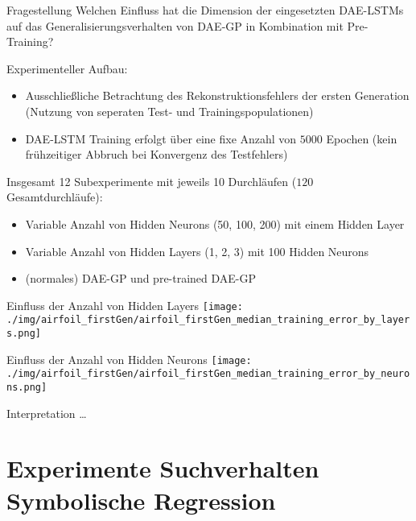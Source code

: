 \documentclass[
  ignorenonframetext,
]{beamer}
\providecommand{\tightlist}{%
  \setlength{\itemsep}{0pt}\setlength{\parskip}{0pt}}
\begin{document}
\begin{frame}{Fragestellung}
\protect\hypertarget{fragestellung}{}
Welchen Einfluss hat die Dimension der eingesetzten DAE-LSTMs auf das
Generalisierungsverhalten von DAE-GP in Kombination mit Pre-Training?

Experimenteller Aufbau:

\begin{itemize}
\tightlist
\item
  Ausschließliche Betrachtung des Rekonstruktionsfehlers der ersten
  Generation (Nutzung von seperaten Test- und Trainingspopulationen)
\item
  DAE-LSTM Training erfolgt über eine fixe Anzahl von \(5000\) Epochen
  (kein frühzeitiger Abbruch bei Konvergenz des Testfehlers)
\end{itemize}

Insgesamt 12 Subexperimente mit jeweils 10 Durchläufen (\(120\)
Gesamtdurchläufe):

\begin{itemize}
\tightlist
\item
  Variable Anzahl von Hidden Neurons (50, 100, 200) mit einem Hidden
  Layer
\item
  Variable Anzahl von Hidden Layers (1, 2, 3) mit 100 Hidden Neurons
\item
  (normales) DAE-GP und pre-trained DAE-GP
\end{itemize}
\end{frame}

\begin{frame}{Einfluss der Anzahl von Hidden Layers}
\protect\hypertarget{einfluss-der-anzahl-von-hidden-layers}{}
\texttt{[image: ./img/airfoil\_firstGen/airfoil\_firstGen\_median\_training\_error\_by\_layers.png]}
\end{frame}

\begin{frame}{Einfluss der Anzahl von Hidden Neurons}
\protect\hypertarget{einfluss-der-anzahl-von-hidden-neurons}{}
\texttt{[image: ./img/airfoil\_firstGen/airfoil\_firstGen\_median\_training\_error\_by\_neurons.png]}
\end{frame}

\begin{frame}{Interpretation}
\protect\hypertarget{interpretation}{}
\ldots{}
\end{frame}

\hypertarget{experimente-suchverhalten-symbolische-regression}{%
\section{Experimente Suchverhalten Symbolische
Regression}\label{experimente-suchverhalten-symbolische-regression}}
\end{document}
